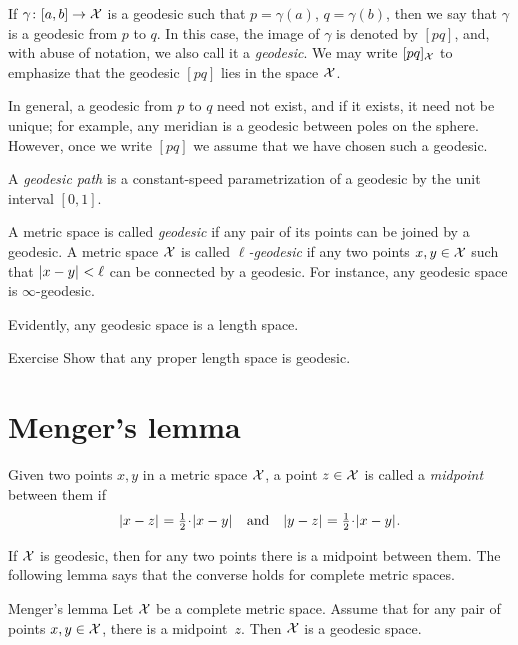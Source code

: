 If $\gamma\colon[a,b]\to \mathcal{X}$ is a geodesic such that $p=\gamma(a)$, $q=\gamma(b)$, then we say that $\gamma$ is a geodesic from $p$ to $q$.
In this case, the image of $\gamma$ is denoted by $[p q]$, and, with abuse of notation, we also call it a \emph{geodesic}.
We may write $[p q]_{\mathcal{X}}$ 
to emphasize that the geodesic $[p q]$ lies in the space ${\mathcal{X}}$.

In general, a geodesic from $p$ to $q$ need not exist, and if it exists, it need not be unique;
for example, any meridian is a geodesic between poles on the sphere.
However, once we write $[p q]$ we assume that we have chosen such a geodesic.

A \emph{geodesic path} is a constant-speed parametrization of a geodesic by the unit interval $[0,1]$.

A metric space is called \emph{geodesic} if any pair of its points can be joined by a geodesic.
A metric space $\mathcal{X}$ is called \emph{$\ell$-geodesic}
if any two points $x,y\in\mathcal{X}$ such that $\dist{x}{y}{}<\ell$ can be connected by a geodesic.
For instance, any geodesic space is $\infty$-geodesic.

Evidently, any geodesic space is a length space.

\begin{thm}{Exercise}\label{ex:compact-length}
Show that any proper length space is geodesic.
\end{thm}

\section{Menger's lemma}
Given two points $x,y$ in a metric space $\mathcal{X}$, a point $z\in \mathcal{X}$ is called a  \emph{midpoint} between them if
\[\dist{x}{z}{}=\tfrac12\cdot\dist{x}{y}{}
\quad\text{and}\quad
\dist{y}{z}{}=\tfrac12\cdot\dist{x}{y}{}.\]

If $\mathcal{X}$ is geodesic, then for any two points there is a midpoint between them.
The following lemma says that the converse holds for complete metric spaces.

\begin{thm}{Menger's lemma}\label{lem:mid>geod}
Let $\mathcal{X}$ be a complete metric space.
Assume that for any pair of points $x,y\in \mathcal{X}$, 
there is a midpoint~$z$.
Then $\mathcal{X}$ is a geodesic space.

\end{thm}

